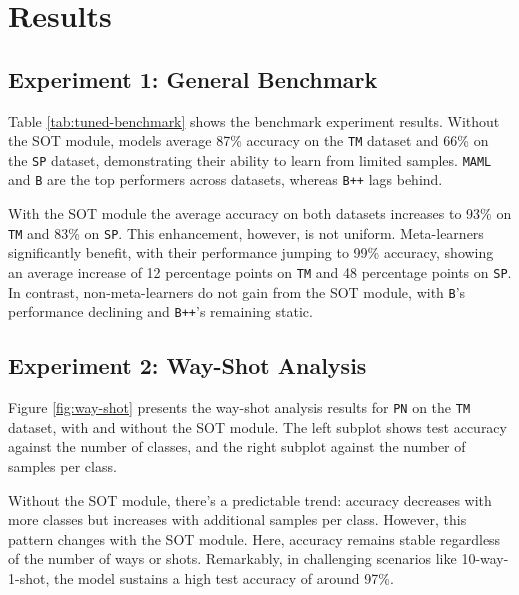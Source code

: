 \section{Results}


\subsection{Experiment 1: General Benchmark}

Table \ref{tab:tuned-benchmark} shows the benchmark experiment results. Without the SOT module, models average 87\% accuracy on the \texttt{TM} dataset and 66\% on the \texttt{SP} dataset, demonstrating their ability to learn from limited samples. \texttt{MAML} and \texttt{B} are the top performers across datasets, whereas \texttt{B++} lags behind.

With the SOT module the average accuracy on both datasets increases to 93\% on \texttt{TM} and 83\% on \texttt{SP}. This enhancement, however, is not uniform. Meta-learners significantly benefit, with their performance jumping to 99\% accuracy, showing an average increase of 12 percentage points on \texttt{TM} and 48 percentage points on \texttt{SP}. In contrast, non-meta-learners do not gain from the SOT module, with \texttt{B}'s performance declining and \texttt{B++}'s remaining static.




\subsection{Experiment 2: Way-Shot Analysis}

Figure \ref{fig:way-shot} presents the way-shot analysis results for \texttt{PN} on the \texttt{TM} dataset, with and without the SOT module. The left subplot shows test accuracy against the number of classes, and the right subplot against the number of samples per class.

Without the SOT module, there's a predictable trend: accuracy decreases with more classes but increases with additional samples per class. However, this pattern changes with the SOT module. Here, accuracy remains stable regardless of the number of ways or shots. Remarkably, in challenging scenarios like 10-way-1-shot, the model sustains a high test accuracy of around 97\%.

